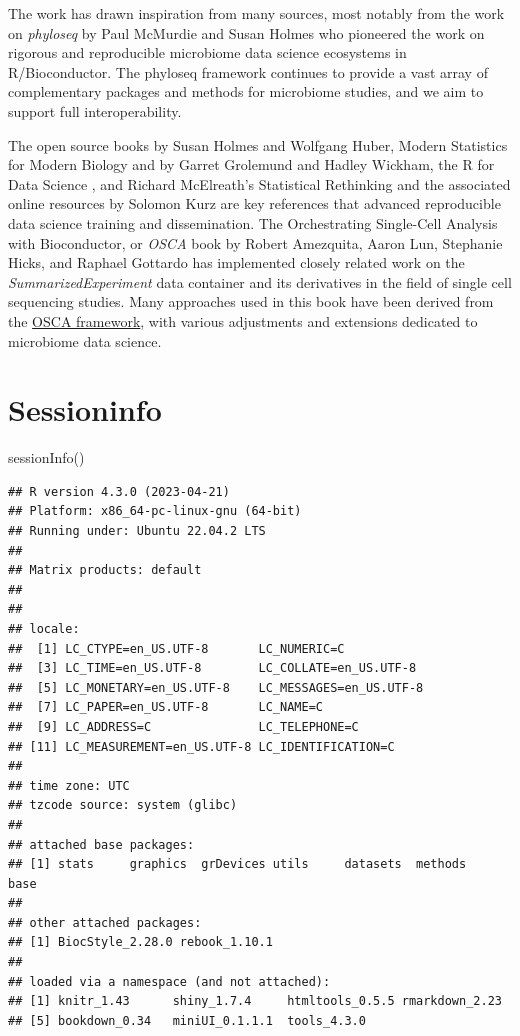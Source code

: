 \documentclass[
]{book}
\newenvironment{Shaded}{\begin{snugshade}}{\end{snugshade}}
\newcommand{\FunctionTok}[1]{\textcolor[rgb]{0.00,0.00,0.00}{#1}}
\newcommand{\NormalTok}[1]{#1}
\begin{document}
The work has drawn inspiration from many sources, most notably from
the work on \emph{phyloseq} by Paul McMurdie and Susan Holmes
\citep{McMurdie2013} who pioneered the work on rigorous and reproducible
microbiome data science ecosystems in R/Bioconductor. The phyloseq
framework continues to provide a vast array of complementary packages
and methods for microbiome studies, and we aim to support full
interoperability.

The open source books by Susan Holmes and Wolfgang Huber, Modern
Statistics for Modern Biology \citep{Holmes2019} and by Garret Grolemund
and Hadley Wickham, the R for Data Science \citep{Grolemund2017}, and
Richard McElreath's Statistical Rethinking and the associated online
resources by Solomon Kurz \citep{McElreath2020} are key references that
advanced reproducible data science training and dissemination. The
Orchestrating Single-Cell Analysis with Bioconductor, or \emph{OSCA} book
by Robert Amezquita, Aaron Lun, Stephanie Hicks, and Raphael Gottardo
\citep{Amezquita2020natmeth} has implemented closely related work on the
\emph{SummarizedExperiment} data container and its derivatives in the field
of single cell sequencing studies. Many approaches used in this book
have been derived from the \href{https://bioconductor.org/books/release/OSCA/}{OSCA
framework}, with various
adjustments and extensions dedicated to microbiome data science.

\hypertarget{sessioninfo}{%
\chapter*{Sessioninfo}\label{sessioninfo}}

\begin{Shaded}
\begin{Highlighting}[]
\FunctionTok{sessionInfo}\NormalTok{()}
\end{Highlighting}
\end{Shaded}

\begin{verbatim}
## R version 4.3.0 (2023-04-21)
## Platform: x86_64-pc-linux-gnu (64-bit)
## Running under: Ubuntu 22.04.2 LTS
## 
## Matrix products: default
## 
## 
## locale:
##  [1] LC_CTYPE=en_US.UTF-8       LC_NUMERIC=C              
##  [3] LC_TIME=en_US.UTF-8        LC_COLLATE=en_US.UTF-8    
##  [5] LC_MONETARY=en_US.UTF-8    LC_MESSAGES=en_US.UTF-8   
##  [7] LC_PAPER=en_US.UTF-8       LC_NAME=C                 
##  [9] LC_ADDRESS=C               LC_TELEPHONE=C            
## [11] LC_MEASUREMENT=en_US.UTF-8 LC_IDENTIFICATION=C       
## 
## time zone: UTC
## tzcode source: system (glibc)
## 
## attached base packages:
## [1] stats     graphics  grDevices utils     datasets  methods   base     
## 
## other attached packages:
## [1] BiocStyle_2.28.0 rebook_1.10.1   
## 
## loaded via a namespace (and not attached):
## [1] knitr_1.43      shiny_1.7.4     htmltools_0.5.5 rmarkdown_2.23 
## [5] bookdown_0.34   miniUI_0.1.1.1  tools_4.3.0
\end{verbatim}

  
\end{document}

